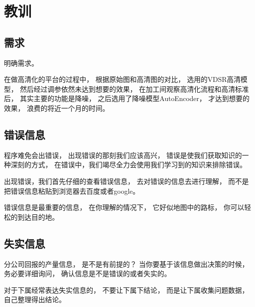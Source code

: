 
\chapter{教训}

\section{需求}

明确需求。

在做高清化的平台的过程中，
根据原始图和高清图的对比，
选用的VDSR高清模型，
然后经过调参依然未达到想要的效果，
在加工间观察高清化流程和高清标准后，
其实主要的功能是降噪，
之后选用了降噪模型AutoEncoder，
才达到想要的效果，
浪费的将近一个月的时间。



\section{错误信息}

程序难免会出错误，
出现错误的那刻我们应该高兴，
错误是使我们获取知识的一种深刻的方式，
在错误中，我们竭尽全力会使用我们学习到的知识来排除错误。

出现错误，我们首先仔细的查看错误信息，
去对错误的信息去进行理解，
而不是把错误信息粘贴到浏览器去百度或者google。

错误信息是最重要的信息，
在你理解的情况下，
它好似地图中的路标，
你可以轻松的到达目的地。



\section{失实信息}

分公司回报的产量信息，
是不是有前提的？
当你要基于该信息做出决策的时候，
务必要详细询问，
确认信息是不是错误的或者失实的。


对于下属经常表达失实信息的，
不要让下属下结论，
而是让下属收集问题数据，
自己整理得出结论。







